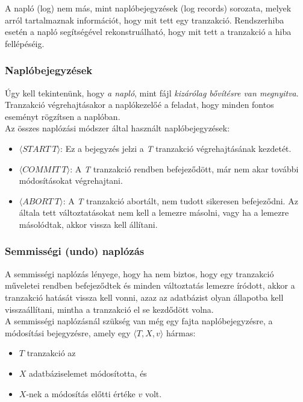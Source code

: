 \documentclass[12pt,margin=0px]{article}
\begin{document}
	\noindent A napló (log) nem más, mint naplóbejegyzések (log records) sorozata, melyek arról tartalmaznak információt, hogy mit tett egy tranzakció. Rendszerhiba esetén a napló segítségével rekonstruálható, hogy mit tett a tranzakció a hiba fellépéséig.
	
	\subsubsection*{Naplóbejegyzések}
	
	Úgy kell tekintenünk, hogy \emph{a napló}, mint fájl \emph{kizárólag bővítésre van megnyitva}.\\
    Tranzakció végrehajtásakor a naplókezelőé a feladat, hogy minden fontos eseményt rögzítsen a naplóban.\\

	\noindent Az összes naplózási módszer által használt naplóbejegyzések:
	\begin{itemize}
		\item	$\langle START \ T \rangle$: Ez a bejegyzés jelzi a \emph{T} tranzakció végrehajtásának kezdetét.
		\item	$\langle COMMIT \ T \rangle$: A \emph{T} tranzakció rendben befejeződött, már nem akar további módosításokat végrehajtani.
		\item	$\langle ABORT \ T \rangle$: A \emph{T} tranzakció abortált, nem tudott sikeresen befejeződni. Az általa tett változtatásokat
		nem kell a lemezre másolni, vagy ha a lemezre másolódtak, akkor vissza kell állítani.
	\end{itemize}
	
	\subsubsection*{Semmisségi (undo) naplózás}
	
    \noindent A semmisségi naplózás lényege, hogy ha nem biztos, hogy egy tranzakció műveletei rendben befejeződtek és minden változtatás lemezre íródott, akkor a tranzakció hatását vissza kell vonni, azaz az adatbázist olyan állapotba kell visszaállítani, mintha a tranzakció el se kezdődött volna.\\
	
	\noindent A semmisségi naplózásnál szükség van még egy fajta naplóbejegyzésre, a módosítási bejegyzésre, amely egy $\langle T,X,v\rangle$ hármas:
    \begin{itemize}
        \item $T$ tranzakció az
        \item $X$ adatbáziselemet módosította, és
        \item $X$-nek a módosítás előtti értéke $v$ volt.
    \end{itemize}
	
\end{document}
